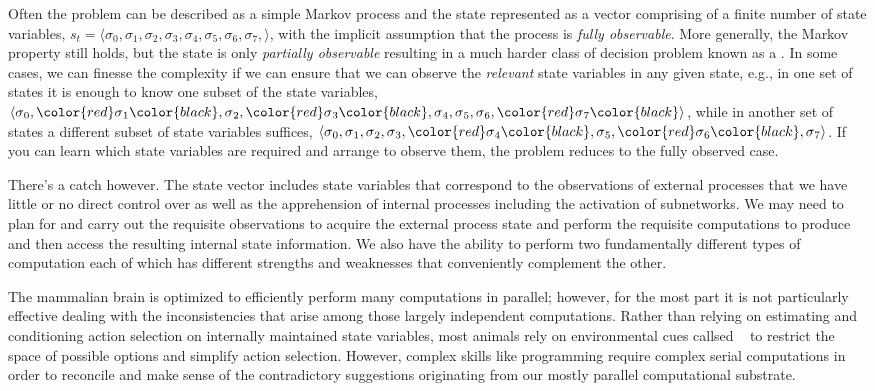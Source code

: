 Often the problem can be described as a simple Markov process and the state represented as a vector comprising of a finite number of state variables, $s_t = \langle{} \sigma{}_0, \sigma{}_1, \sigma{}_2, \sigma{}_3, \sigma{}_4, \sigma{}_5, \sigma{}_6, \sigma{}_7, \rangle{}$, with the implicit assumption that the process is {\it{fully observable}}. More generally, the Markov property still holds, but the state is only {\it{partially observable}} resulting in a much harder class of decision problem known as a {}. In some cases, we can finesse the complexity if we can ensure that we can observe the {\it{relevant}} state variables in any given state, e.g., in one set of states it is enough to know one subset of the state variables, $\langle{} \sigma{}_0, \color{red}\sigma{}_1\color{black}, \sigma{}_2, \color{red}\sigma{}_3\color{black}, \sigma{}_4, \sigma{}_5, \sigma{}_6, \color{red}\sigma{}_7\color{black} \rangle{}$, while in another set of states a different subset of state variables suffices, $\langle{} \sigma{}_0, \sigma{}_1, \sigma{}_2, \sigma{}_3, \color{red}\sigma{}_4\color{black}, \sigma{}_5, \color{red}\sigma{}_6\color{black}, \sigma{}_7 \rangle{}$. If you can learn which state variables are required and arrange to observe them, the problem reduces to the fully observed case. 

There's a catch however. The state vector includes state variables that correspond to the observations of external processes that we have little or no direct control over as well as the apprehension of internal processes including the activation of subnetworks. We may need to plan for and carry out the requisite observations to acquire the external process state and perform the requisite computations to produce and then access the resulting internal state information. We also have the ability to perform two fundamentally different types of computation each of which has different strengths and weaknesses that conveniently complement the other.

The mammalian brain is optimized to efficiently perform many computations in parallel; however, for the most part it is not particularly effective dealing with the inconsistencies that arise among those largely independent computations. Rather than relying on estimating and conditioning action selection on internally maintained state variables, most animals rely on environmental cues \emdash{} callsed {}~\cite{GibsonAFFORDANCES-79} \emdash{} to restrict the space of possible options and simplify action selection. However, complex skills like programming require complex serial computations in order to reconcile and make sense of the contradictory suggestions originating from our mostly parallel computational substrate. 

